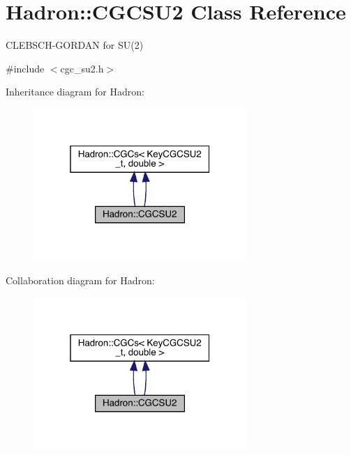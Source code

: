 \hypertarget{classHadron_1_1CGCSU2}{}\section{Hadron\+:\+:C\+G\+C\+S\+U2 Class Reference}
\label{classHadron_1_1CGCSU2}


C\+L\+E\+B\+S\+C\+H-\/\+G\+O\+R\+D\+AN for S\+U(2)  




{\ttfamily \#include $<$cgc\+\_\+su2.\+h$>$}



Inheritance diagram for Hadron\+:\nopagebreak
\begin{figure}[H]
\begin{center}
\leavevmode
\includegraphics[width=229pt]{d1/d43/classHadron_1_1CGCSU2__inherit__graph}
\end{center}
\end{figure}


Collaboration diagram for Hadron\+:\nopagebreak
\begin{figure}[H]
\begin{center}
\leavevmode
\includegraphics[width=229pt]{d7/da0/classHadron_1_1CGCSU2__coll__graph}
\end{center}
\end{figure}
